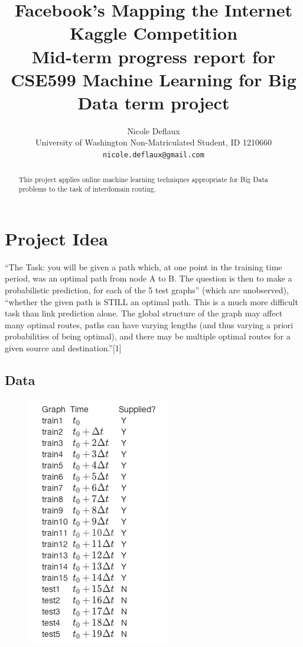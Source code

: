 \documentclass{article} %
\title{Facebook's Mapping the Internet Kaggle Competition \\
{\small Mid-term progress report for CSE599 Machine Learning for Big Data term project}}
\author{Nicole Deflaux \\
University of Washington Non-Matriculated Student, ID 1210660 \\
\texttt{nicole.deflaux@gmail.com}
}
\begin{document}
\maketitle

\begin{abstract}
  This project applies online machine learning techniques appropriate for
  Big Data problems to the task of interdomain routing.
\end{abstract}

\section{Project Idea}
``The Task: you will be given a path which, at one point in the training time
period, was an optimal path from node A to B. The question is then to make a
probabilistic prediction, for each of the 5 test graphs'' (which are
unobserved), ``whether the given path is STILL an optimal path.  This is a
much more difficult task than link prediction alone. The global structure of
the graph may affect many optimal routes, paths can have varying lengths
(and thus varying a priori probabilities of being optimal), and there may be
multiple optimal routes for a given source and destination.''[1]

\subsection{Data}

\begin{figure}
  \begin{center}
    \includegraphics[scale=.5]{trainAndTestGraphs.png}
  \end{center}
\end{figure}
\end{document}

